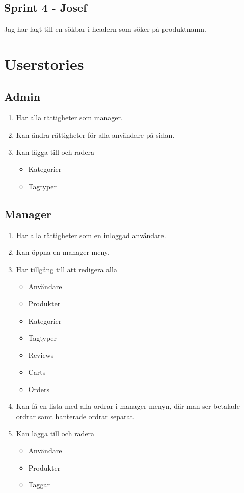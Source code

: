 \documentclass[a4paper]{article}
\begin{document}
\subsection{Sprint 4 - Josef}
Jag har lagt till en sökbar i headern som söker på produktnamn.

\newpage
\section{Userstories}
\subsection{Admin}
\begin{enumerate}
  \item Har alla rättigheter som manager.
  \item Kan ändra rättigheter för alla användare på sidan.
  \item Kan lägga till och radera
  \begin{itemize}
    \item Kategorier
    \item Tagtyper
  \end{itemize}
\end{enumerate}
%
\subsection{Manager}
\begin{enumerate}
  \item Har alla rättigheter som en inloggad användare.
  \item Kan öppna en manager meny.
  \item Har tillgång till att redigera alla
  \begin{itemize}
    \item Användare
    \item Produkter
    \item Kategorier 
    \item Tagtyper
    \item Reviews
    \item Carts
    \item Orders
  \end{itemize}
  \item Kan få en lista med alla ordrar i manager-menyn, där man ser betalade ordrar samt hanterade ordrar separat.
  \item Kan lägga till och radera
  \begin{itemize}
  \item Användare
  \item Produkter
  \item Taggar
  \end{itemize}
\end{enumerate}
%
\end{document}
